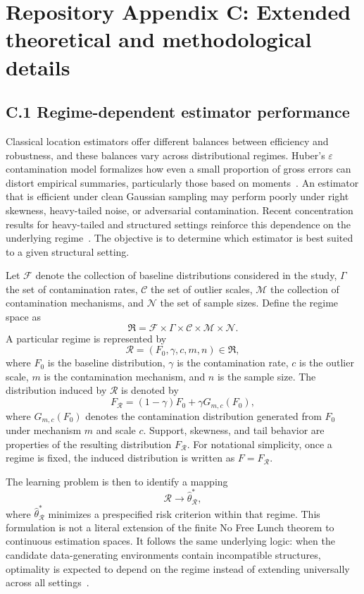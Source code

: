 \section*{Repository Appendix C: Extended theoretical and methodological details}

\subsection*{C.1 Regime-dependent estimator performance}

Classical location estimators offer different balances between efficiency and robustness, and these balances vary across distributional regimes. Huber’s $\varepsilon$ contamination model formalizes how even a small proportion of gross errors can distort empirical summaries, particularly those based on moments~\citep{huber1964robust}. An estimator that is efficient under clean Gaussian sampling may perform poorly under right skewness, heavy-tailed noise, or adversarial contamination. Recent concentration results for heavy-tailed and structured settings reinforce this dependence on the underlying regime~\citep{oliveira2022improved,cai2022nonasymptotic}. The objective is to determine which estimator is best suited to a given structural setting.

Let $\mathcal{F}$ denote the collection of baseline distributions considered in the study, $\Gamma$ the set of contamination rates, $\mathcal{C}$ the set of outlier scales, $\mathcal{M}$ the collection of contamination mechanisms, and $\mathcal{N}$ the set of sample sizes. Define the regime space as
\[
\mathfrak{R}
=
\mathcal{F}
\times
\Gamma
\times
\mathcal{C}
\times
\mathcal{M}
\times
\mathcal{N}.
\]
A particular regime is represented by
\[
\mathcal{R}
=
(F_0,\gamma,c,m,n)
\in
\mathfrak{R},
\]
where $F_0$ is the baseline distribution, $\gamma$ is the contamination rate, $c$ is the outlier scale, $m$ is the contamination mechanism, and $n$ is the sample size. The distribution induced by $\mathcal{R}$ is denoted by
\[
F_{\mathcal{R}}
=
(1-\gamma)F_0
+
\gamma G_{m,c}(F_0),
\]
where $G_{m,c}(F_0)$ denotes the contamination distribution generated from $F_0$ under mechanism $m$ and scale $c$. Support, skewness, and tail behavior are properties of the resulting distribution $F_{\mathcal{R}}$. For notational simplicity, once a regime is fixed, the induced distribution is written as $F=F_{\mathcal{R}}$.

The learning problem is then to identify a mapping
\[
\mathcal{R}
\longrightarrow
\widehat{\theta}^{*}_{\mathcal{R}},
\]
where $\widehat{\theta}^{*}_{\mathcal{R}}$ minimizes a prespecified risk criterion within that regime. This formulation is not a literal extension of the finite No Free Lunch theorem to continuous estimation spaces. It follows the same underlying logic: when the candidate data-generating environments contain incompatible structures, optimality is expected to depend on the regime instead of extending universally across all settings~\citep{wolpert1997nfl,goldblum2024nfl,wolpert2021metainduction,sterkenburg2021nfl}.

